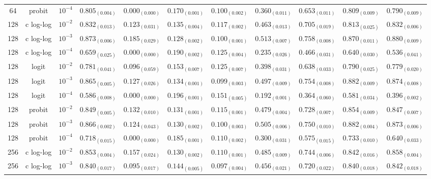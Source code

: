 \documentclass[journal]{IEEEtran}
\begin{document}
\begin{table*}[!t]
\begin{tabular}{c@{\hskip 0.15cm}c@{\hskip 0.15cm}c|c@{\hskip 0.30cm}c@{\hskip 0.20cm}c@{\hskip 0.20cm}c@{\hskip 0.20cm}c@{\hskip 0.20cm}c@{\hskip 0.20cm}c@{\hskip 0.20cm}c}
			64 & probit & $10^{-4}$ & $0.805_{(0.004)}$ & $0.000_{(0.000)}$ & $0.170_{(0.001)}$ & $0.100_{(0.002)}$ & $0.360_{(0.011)}$ & $0.653_{(0.011)}$ & $0.809_{(0.009)}$ & $0.790_{(0.009)}$\\
			128 & c log-log & $10^{-2}$ & $0.832_{(0.013)}$ & $0.123_{(0.031)}$ & $0.135_{(0.004)}$ & $0.117_{(0.002)}$ & $0.463_{(0.013)}$ & $0.705_{(0.019)}$ & $0.813_{(0.025)}$ & $0.832_{(0.006)}$\\
			128 & c log-log & $10^{-3}$ & $0.873_{(0.006)}$ & $\mathbf{0.185_{(0.029)}}$ & $0.128_{(0.002)}$ & $0.100_{(0.001)}$ & $0.513_{(0.007)}$ & $0.758_{(0.008)}$ & $0.870_{(0.011)}$ & $0.880_{(0.009)}$\\
			128 & c log-log & $10^{-4}$ & $0.659_{(0.025)}$ & $0.000_{(0.000)}$ & $0.190_{(0.002)}$ & $0.125_{(0.004)}$ & $0.235_{(0.026)}$ & $0.466_{(0.031)}$ & $0.640_{(0.030)}$ & $0.536_{(0.041)}$\\
			128 & logit & $10^{-2}$ & $0.781_{(0.041)}$ & $0.096_{(0.059)}$ & $0.153_{(0.007)}$ & $0.125_{(0.007)}$ & $0.398_{(0.031)}$ & $0.638_{(0.033)}$ & $0.790_{(0.025)}$ & $0.779_{(0.020)}$\\
			128 & logit & $10^{-3}$ & $0.865_{(0.005)}$ & $0.127_{(0.026)}$ & $0.134_{(0.001)}$ & $0.099_{(0.003)}$ & $0.497_{(0.009)}$ & $0.754_{(0.008)}$ & $0.882_{(0.009)}$ & $0.874_{(0.008)}$\\
			128 & logit & $10^{-4}$ & $0.586_{(0.008)}$ & $0.000_{(0.000)}$ & $0.196_{(0.001)}$ & $0.151_{(0.005)}$ & $0.192_{(0.001)}$ & $0.364_{(0.060)}$ & $0.581_{(0.034)}$ & $0.396_{(0.002)}$\\
			128 & probit & $10^{-2}$ & $0.849_{(0.005)}$ & $0.132_{(0.010)}$ & $0.131_{(0.001)}$ & $0.115_{(0.001)}$ & $0.479_{(0.004)}$ & $0.728_{(0.007)}$ & $0.854_{(0.009)}$ & $0.847_{(0.007)}$\\
			128 & probit & $10^{-3}$ & $0.866_{(0.002)}$ & $0.124_{(0.043)}$ & $0.130_{(0.002)}$ & $0.100_{(0.003)}$ & $0.505_{(0.006)}$ & $0.750_{(0.010)}$ & $0.882_{(0.004)}$ & $0.873_{(0.006)}$\\
			128 & probit & $10^{-4}$ & $0.718_{(0.015)}$ & $0.000_{(0.000)}$ & $0.185_{(0.001)}$ & $0.110_{(0.002)}$ & $0.300_{(0.031)}$ & $0.575_{(0.015)}$ & $0.733_{(0.010)}$ & $0.640_{(0.033)}$\\
			256 & c log-log & $10^{-2}$ & $0.853_{(0.004)}$ & $0.157_{(0.024)}$ & $0.130_{(0.002)}$ & $0.110_{(0.001)}$ & $0.485_{(0.009)}$ & $0.744_{(0.006)}$ & $0.842_{(0.016)}$ & $0.858_{(0.004)}$\\
			256 & c log-log & $10^{-3}$ & $0.840_{(0.017)}$ & $0.095_{(0.017)}$ & $0.144_{(0.005)}$ & $0.097_{(0.004)}$ & $0.456_{(0.021)}$ & $0.720_{(0.022)}$ & $0.840_{(0.018)}$ & $0.842_{(0.018)}$\\

\end{tabular}
\end{table*}
\end{document}
